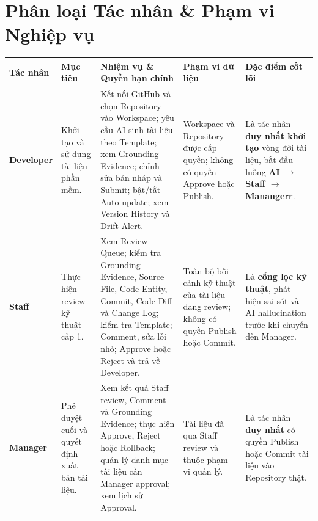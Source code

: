 
\section{Phân loại Tác nhân \& Phạm vi Nghiệp vụ }
\label{sec:actor-classification}
\begingroup
\setlength{\tabcolsep}{4pt} %
\small %

\begin{longtable}{|
>{\raggedright\arraybackslash}p{}|
>{\raggedright\arraybackslash}p{}|
>{\raggedright\arraybackslash}p{}|
>{\raggedright\arraybackslash}p{}|
>{\raggedright\arraybackslash}p{}|}
\hline

\textbf{Tác nhân} &
\textbf{Mục tiêu} &
\textbf{Nhiệm vụ \& Quyền hạn chính} &
\textbf{Phạm vi dữ liệu} &
\textbf{Đặc điểm cốt lõi} \\
\hline
\endhead %

\textbf{Developer} &
Khởi tạo và sử dụng tài liệu phần mềm. &
Kết nối GitHub và chọn Repository vào Workspace; yêu cầu AI sinh tài liệu theo Template; xem Grounding Evidence; chỉnh sửa bản nháp và Submit; bật/tắt Auto-update; xem Version History và Drift Alert. &
Workspace và Repository được cấp quyền; không có quyền Approve hoặc Publish. &
Là tác nhân \textbf{duy nhất khởi tạo} vòng đời tài liệu, bắt đầu luồng \textbf{AI $\rightarrow$ Staff $\rightarrow$  Manangerr}. \\
\hline

\textbf{Staff} &
Thực hiện review kỹ thuật cấp 1. &
Xem Review Queue; kiểm tra Grounding Evidence, Source File, Code Entity, Commit, Code Diff và Change Log; kiểm tra Template; Comment, sửa lỗi nhỏ; Approve hoặc Reject và trả về Developer. &
Toàn bộ bối cảnh kỹ thuật của tài liệu đang review; không có quyền Publish hoặc Commit. &
Là \textbf{cổng lọc kỹ thuật}, phát hiện sai sót và AI hallucination trước khi chuyển đến Manager. \\
\hline

\textbf{Manager} &
Phê duyệt cuối và quyết định xuất bản tài liệu. &
Xem kết quả Staff review, Comment và Grounding Evidence; thực hiện Approve, Reject hoặc Rollback; quản lý danh mục tài liệu cần Manager approval; xem lịch sử Approval. &
Tài liệu đã qua Staff review và thuộc phạm vi quản lý. &
Là tác nhân \textbf{duy nhất} có quyền Publish hoặc Commit tài liệu vào Repository thật. \\
\hline


\end{longtable}
